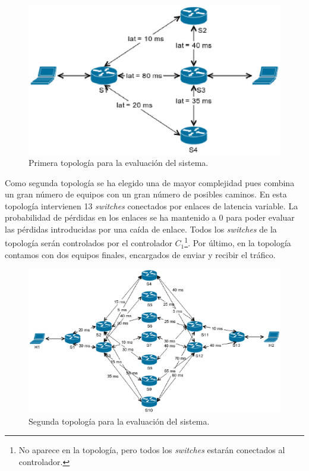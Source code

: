 \documentclass[a4paper,11pt]{book}
\begin{document}
\begin{figure}[htb]
\centering
\includegraphics[scale=0.7]{./figuras/topofinal1}
\caption{Primera topología para la evaluación del sistema.}
\label{topofinal1}
\end{figure}

Como segunda topología se ha elegido una de mayor complejidad pues combina un gran número de equipos con un gran número de posibles caminos. En esta topología intervienen 13 \emph{switches} conectados por enlaces de latencia variable. La probabilidad de pérdidas en los enlaces se ha mantenido a 0 para poder evaluar las pérdidas introducidas por una caída de enlace. Todos los \emph{switches} de la topología serán controlados por el controlador $C_{1}$\footnote{No aparece en la topología, pero todos los \emph{switches} estarán conectados al controlador.}. Por último, en la topología contamos con dos equipos finales, encargados de enviar y recibir el tráfico.

\begin{figure}[tb]
\centering
\includegraphics[scale=0.5]{./figuras/topofinal2}
\caption{Segunda topología para la evaluación del sistema.}
\label{topofinal2}
\end{figure}
\end{document}

